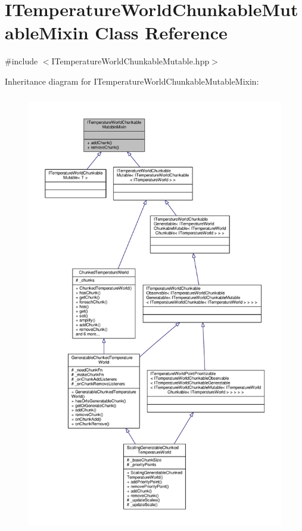 \hypertarget{class_i_temperature_world_chunkable_mutable_mixin}{\section{I\-Temperature\-World\-Chunkable\-Mutable\-Mixin Class Reference}
\label{class_i_temperature_world_chunkable_mutable_mixin}
}


{\ttfamily \#include $<$I\-Temperature\-World\-Chunkable\-Mutable.\-hpp$>$}



Inheritance diagram for I\-Temperature\-World\-Chunkable\-Mutable\-Mixin\-:
\nopagebreak
\begin{figure}[H]
\begin{center}
\leavevmode
\includegraphics[height=550pt]{class_i_temperature_world_chunkable_mutable_mixin__inherit__graph}
\end{center}
\end{figure}


